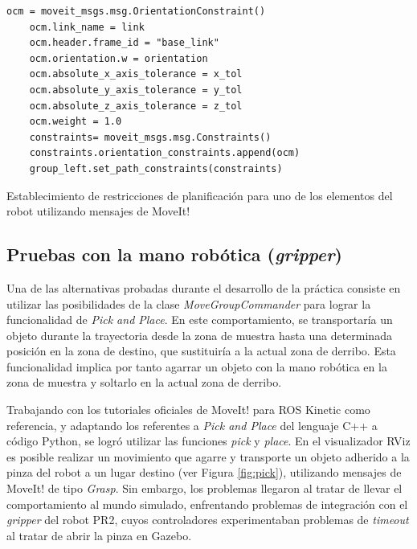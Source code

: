 \documentclass[12pt,spanish,chapterprefix, numbers=noenddot]{book}
\numberwithin{equation}{section}
\numberwithin{figure}{section}
\begin{document}
\begin{algorithm}[htb!]
	\begin{lstlisting}[breaklines=true] 
    ocm = moveit_msgs.msg.OrientationConstraint()
    ocm.link_name = link
    ocm.header.frame_id = "base_link"
    ocm.orientation.w = orientation
    ocm.absolute_x_axis_tolerance = x_tol
    ocm.absolute_y_axis_tolerance = y_tol
    ocm.absolute_z_axis_tolerance = z_tol
    ocm.weight = 1.0
    constraints= moveit_msgs.msg.Constraints()
    constraints.orientation_constraints.append(ocm)
    group_left.set_path_constraints(constraints)
	\end{lstlisting}
\caption{\label{alg:constraints} Establecimiento de restricciones de planificación para uno de los elementos del robot utilizando mensajes de MoveIt!}
\end{algorithm}
\newpage
\subsection{Pruebas con la mano robótica (\textit{gripper})}

Una de las alternativas probadas durante el desarrollo de la práctica consiste en utilizar las posibilidades de la clase \textit{MoveGroupCommander} para lograr la funcionalidad de \textit{Pick and Place}. En este comportamiento, se transportaría un objeto durante la trayectoria desde la zona de muestra hasta una determinada posición en la zona de destino, que sustituiría a la actual zona de derribo. Esta funcionalidad implica por tanto agarrar un objeto con la mano robótica en la zona de muestra y soltarlo en la actual zona de derribo.  

Trabajando con los tutoriales oficiales de MoveIt! para ROS Kinetic como referencia, y adaptando los referentes a \textit{Pick and Place} del lenguaje C++ a código Python, se logró utilizar las funciones \textit{pick} y \textit{place}. En el visualizador RViz es posible realizar un movimiento que agarre y transporte un objeto adherido a la pinza del robot a un lugar destino (ver Figura \ref{fig:pick}), utilizando mensajes de MoveIt! de tipo \textit{Grasp}. Sin embargo, los problemas llegaron al tratar de llevar el comportamiento al mundo simulado, enfrentando problemas de integración con el \textit{gripper} del robot PR2, cuyos controladores experimentaban problemas de \textit{timeout} al tratar de abrir la pinza en Gazebo. 
\end{document}
